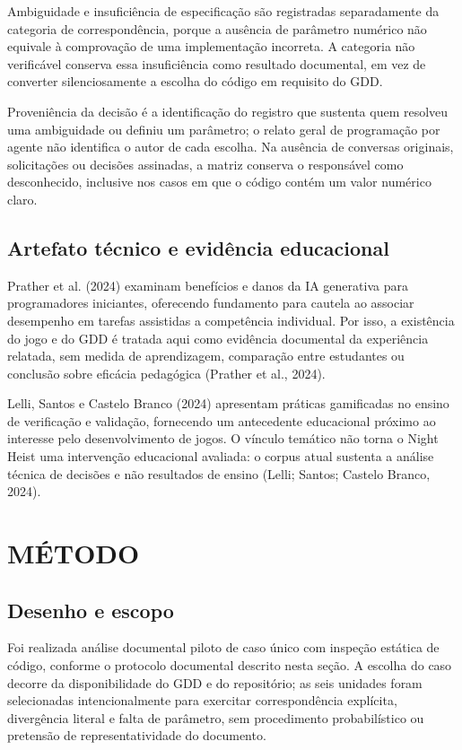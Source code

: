 Ambiguidade e insuficiência de especificação são registradas separadamente da categoria de correspondência, porque a ausência de parâmetro numérico não equivale à comprovação de uma implementação incorreta. A categoria não verificável conserva essa insuficiência como resultado documental, em vez de converter silenciosamente a escolha do código em requisito do GDD.

Proveniência da decisão é a identificação do registro que sustenta quem resolveu uma ambiguidade ou definiu um parâmetro; o relato geral de programação por agente não identifica o autor de cada escolha. Na ausência de conversas originais, solicitações ou decisões assinadas, a matriz conserva o responsável como desconhecido, inclusive nos casos em que o código contém um valor numérico claro.

\subsection{Artefato técnico e evidência educacional}
Prather et al. (2024) examinam benefícios e danos da IA generativa para programadores iniciantes, oferecendo fundamento para cautela ao associar desempenho em tarefas assistidas a competência individual. Por isso, a existência do jogo e do GDD é tratada aqui como evidência documental da experiência relatada, sem medida de aprendizagem, comparação entre estudantes ou conclusão sobre eficácia pedagógica (Prather et al., 2024).

Lelli, Santos e Castelo Branco (2024) apresentam práticas gamificadas no ensino de verificação e validação, fornecendo um antecedente educacional próximo ao interesse pelo desenvolvimento de jogos. O vínculo temático não torna o Night Heist uma intervenção educacional avaliada: o corpus atual sustenta a análise técnica de decisões e não resultados de ensino (Lelli; Santos; Castelo Branco, 2024).

\section{MÉTODO}
\subsection{Desenho e escopo}
Foi realizada análise documental piloto de caso único com inspeção estática de código, conforme o protocolo documental descrito nesta seção. A escolha do caso decorre da disponibilidade do GDD e do repositório; as seis unidades foram selecionadas intencionalmente para exercitar correspondência explícita, divergência literal e falta de parâmetro, sem procedimento probabilístico ou pretensão de representatividade do documento.

